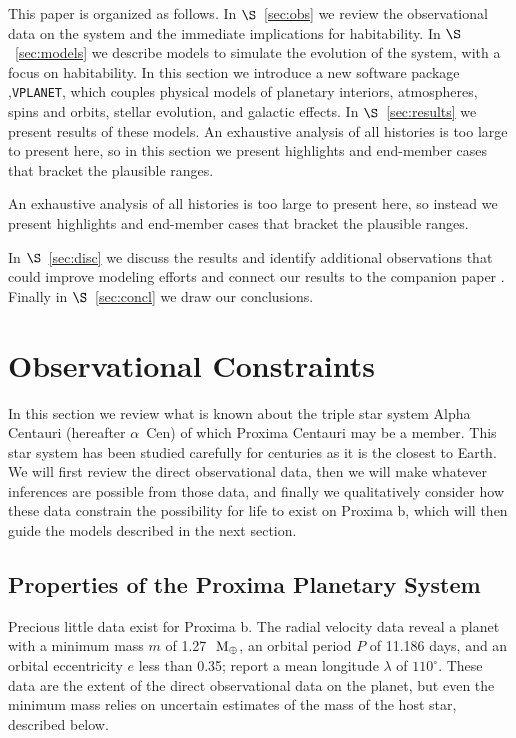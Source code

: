 \documentclass[preprint,12pt]{aastex}
\newcommand{\xxx}[1]{{\color{red} #1}} %
\newcommand{\xxx}[1]{{\color{red} #1}} %
\def\mearth{{\rm\,M_\oplus}}
\def\acen{{$\alpha$~Cen}}
\def\vplanet{\texttt{\footnotesize{VPLANET}}\xspace}
\begin{document}
This paper is organized as follows. In $\S$~\ref{sec:obs} we review
the observational data on the system and the immediate implications
for habitability. In $\S$~\ref{sec:models} we describe models to
simulate the evolution of the system, with a focus on habitability. In
this section we introduce a new software package \xxx{,}\vplanet,
which couples physical models of planetary interiors, atmospheres,
spins and orbits, stellar evolution, and galactic effects. In
$\S$~\ref{sec:results} we present results of these models. An
exhaustive analysis of all histories is too large to present here, so
in this section we present highlights and end-member cases that
bracket the plausible ranges.

\xxx{An
exhaustive analysis of all histories is too large to present here, so
instead we present highlights and end-member cases that
bracket the plausible ranges.}

In $\S$~\ref{sec:disc} we discuss the
results and identify additional observations that could improve
modeling efforts and connect our results to the companion paper
\citep{Meadows16}. Finally in $\S$~\ref{sec:concl} we draw our
conclusions.

\section{Observational Constraints \label{sec:obs}}

In this section we review what is known about the triple star system
Alpha Centauri (hereafter \acen) of which Proxima Centauri may be a
member. This star system has been studied carefully for centuries as
it is the closest to Earth. We will first review the direct
observational data, then we will make whatever inferences are possible
from those data, and finally we qualitatively consider how these data
constrain the possibility for life to exist on Proxima b, which will
then guide the models described in the next section.

\subsection{Properties of the Proxima Planetary System}
\label{sec:obs:planetsys}
Precious little data exist for Proxima b. The radial velocity data
reveal a planet with a minimum mass $m$ of 1.27~$\mearth$, an orbital period $P$
of 11.186 days, and an orbital eccentricity $e$ less than 0.35;
\cite{AngladaEscude16} report a mean longitude $\lambda$ of $110^\circ$. These
data are the extent of the direct observational data on the planet,
but even the minimum mass relies on uncertain estimates of the mass of
the host star, described below.
\end{document}
